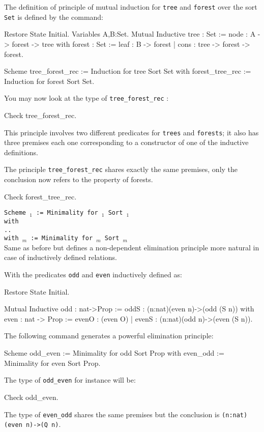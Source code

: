 \Example
The definition of principle of mutual induction for {\tt tree} and
{\tt forest} over the sort {\tt Set} is defined by the command:
\begin{coq_eval}
Restore State Initial.
Variables A,B:Set.
Mutual Inductive tree : Set :=  node : A -> forest -> tree
with forest : Set := leaf : B -> forest 
                   | cons : tree -> forest -> forest.
\end{coq_eval}
\begin{coq_example*}
Scheme tree_forest_rec := Induction for tree Sort Set 
with forest_tree_rec := Induction for forest Sort Set.
\end{coq_example*}
You may now look at the type of {\tt tree\_forest\_rec} :
\begin{coq_example}
Check tree_forest_rec.
\end{coq_example}
This principle involves two different predicates for {\tt trees} and
{\tt forests}; it also has three premises each one corresponding to a
constructor of one of the inductive definitions.

The principle {\tt tree\_forest\_rec} shares exactly the same
premises, only the conclusion now refers to the property of forests.
\begin{coq_example}
Check forest_tree_rec.
\end{coq_example}

\begin{Variant}
\item {\tt Scheme {\ident$_1$} := Minimality for \term$_1$ Sort {\sort$_1$} \\
  with\\
  \mbox{}\hspace{0.1cm} .. \\
        with {\ident$_m$} := Minimality for {\term$_m$} Sort
        {\sort$_m$}}\\
Same as before but defines a non-dependent elimination principle more
natural in case of inductively defined relations. 
\end{Variant}

\Example
With the predicates {\tt odd} and {\tt even} inductively defined as:
\begin{coq_eval}
Restore State Initial.
\end{coq_eval}
\begin{coq_example*}
Mutual Inductive odd : nat->Prop := 
    oddS : (n:nat)(even n)->(odd (S n))
with even : nat -> Prop := 
    evenO : (even O) 
  | evenS : (n:nat)(odd n)->(even (S n)).  
\end{coq_example*}
The following command generates a powerful elimination
principle:
\begin{coq_example*}
Scheme odd_even := Minimality for odd Sort Prop
with   even_odd := Minimality for even Sort Prop.
\end{coq_example*}
The type of {\tt odd\_even} for instance will be:
\begin{coq_example}
Check odd_even.
\end{coq_example}
The type of {\tt even\_odd} shares the same premises but the
conclusion is {\tt (n:nat)(even n)->(Q n)}.



%

